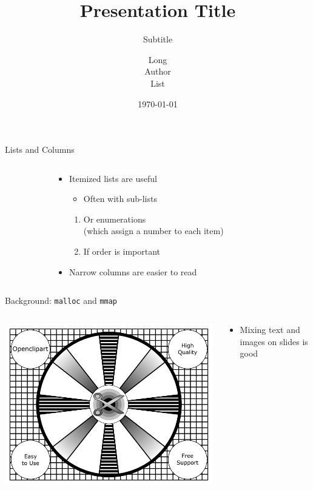 \documentclass[aspectratio=169]{beamer}
\title{Presentation Title}
\subtitle{Subtitle}
\author[Short Author List]{Long\\Author\\List}
\date{\today}
\newcommand{\bi}{\begin{itemize}}
\newcommand{\ei}{\end{itemize}}
\newcommand{\bn}{\begin{enumerate}}
\newcommand{\en}{\end{enumerate}}
\begin{document}
\frame[plain]{\titlepage}

\begin{frame}{Lists and Columns}
  \begin{columns}[T]
    \begin{column}{0.3\textwidth}
    \end{column}
    \begin{column}{0.4\textwidth}
      \bi
    \item Itemized lists are useful
      \bi
    \item Often with sub-lists
      \ei
      \bn
    \item Or enumerations\\(which assign a number to each item)
    \item If order is important
      \en
    \item Narrow columns are easier to read
      \ei
    \end{column}
    \begin{column}{0.3\textwidth}
    \end{column}
  \end{columns}
\end{frame}

\begin{frame}{Background: \texttt{malloc} and \texttt{mmap}}
  \begin{columns}[T]
    \begin{column}{0.5\textwidth}
      \includegraphics[scale=0.3]{./figures/Retro.png}
    \end{column}
    \begin{column}{0.5\textwidth}
      \bi
      \item Mixing text and images on slides is good
      \ei
    \end{column}
  \end{columns}
\end{frame}
\end{document}
